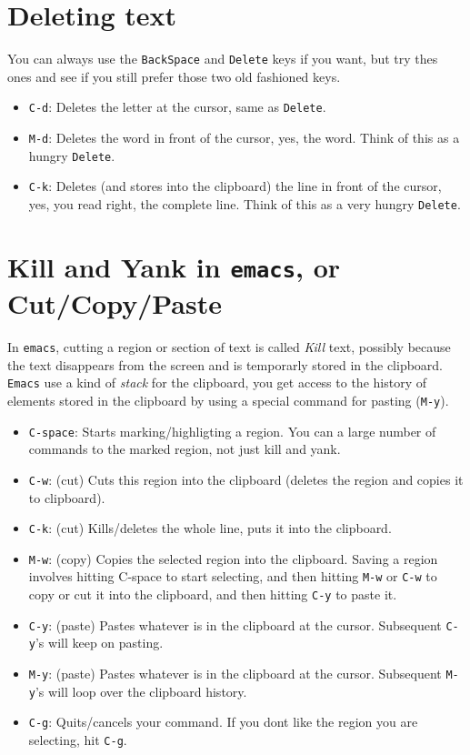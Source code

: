 \documentclass[12pt,a4paper,final]{article} %
\begin{document}
\section{Deleting text}
You can always use the \texttt{BackSpace} and \texttt{Delete} keys if
you want, but try thes ones and see if you still prefer those two old
fashioned keys.
\begin{itemize}
\item \texttt{C-d}: Deletes the letter at the cursor, same as
  \texttt{Delete}.
\item \texttt{M-d}: Deletes the word in front of the cursor, yes, the
  word. Think of this as a hungry \texttt{Delete}.
\item \texttt{C-k}: Deletes (and stores into the clipboard) the line
  in front of the cursor, yes, you read right, the complete
  line. Think of this as a very hungry \texttt{Delete}.
\end{itemize}

\section{Kill and Yank in \texttt{emacs}, or Cut/Copy/Paste}
In \texttt{emacs}, cutting a region or section of text is called
\textit{Kill} text, possibly because the text disappears from the
screen and is temporarly stored in the clipboard. \texttt{Emacs} use a
kind of \textit{stack} for the clipboard, you get access to the
history of elements stored in the clipboard by using a special command
for pasting (\texttt{M-y}).

\begin{itemize}
\item \texttt{C-space}: Starts marking/highligting a region. You can
  a large number of commands to the marked region, not just kill and
  yank.
\item \texttt{C-w}: (cut) Cuts this region into the clipboard
  (deletes the region and copies it to clipboard).
\item \texttt{C-k}: (cut) Kills/deletes the whole line, puts it into
  the clipboard.
\item \texttt{M-w}: (copy) Copies the selected region into the
  clipboard. Saving a region involves hitting C-space to start
  selecting, and then hitting \texttt{M-w} or \texttt{C-w} to copy or
  cut it into the clipboard, and then hitting \texttt{C-y} to paste
  it.
\item \texttt{C-y}: (paste) Pastes whatever is in the clipboard at
  the cursor. Subsequent \texttt{C-y}'s will keep on pasting.
\item \texttt{M-y}: (paste) Pastes whatever is in the clipboard at
  the cursor. Subsequent \texttt{M-y}'s will loop over the clipboard
  history.
\item \texttt{C-g}: Quits/cancels your command. If you dont like the
  region you are selecting, hit \texttt{C-g}.
\end{itemize}
\end{document}
